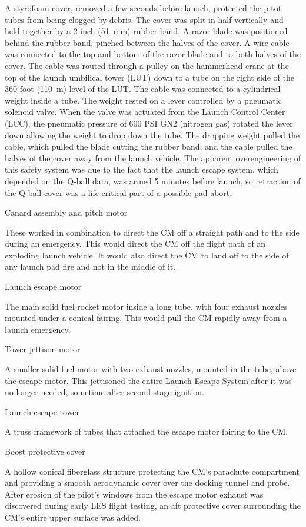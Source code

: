 A styrofoam cover, removed a few seconds before launch, protected the
pitot tubes from being clogged by debris. The cover was split in half
vertically and held together by a 2-inch (51~mm) rubber band. A razor
blade was positioned behind the rubber band, pinched between the halves
of the cover. A wire cable was connected to the top and bottom of the
razor blade and to both halves of the cover. The cable was routed
through a pulley on the hammerhead crane at the top of the launch
umbilical tower (LUT) down to a tube on the right side of the 360-foot
(110~m) level of the LUT. The cable was connected to a cylindrical
weight inside a tube. The weight rested on a lever controlled by a
pneumatic solenoid valve. When the valve was actuated from the Launch
Control Center (LCC), the pneumatic pressure of 600 PSI GN2 (nitrogen
gas) rotated the lever down allowing the weight to drop down the tube.
The dropping weight pulled the cable, which pulled the blade cutting the
rubber band, and the cable pulled the halves of the cover away from the
launch vehicle. The apparent overengineering of this safety system was
due to the fact that the launch escape system, which depended on the
Q-ball data, was armed 5 minutes before launch, so retraction of the
Q-ball cover was a life-critical part of a possible pad abort.

Canard assembly and pitch motor

These worked in combination to direct the CM off a straight path and to
the side during an emergency. This would direct the CM off the flight
path of an exploding launch vehicle. It would also direct the CM to land
off to the side of any launch pad fire and not in the middle of it.

Launch escape motor

The main solid fuel rocket motor inside a long tube, with four exhaust
nozzles mounted under a conical fairing. This would pull the CM rapidly
away from a launch emergency.

Tower jettison motor

A smaller solid fuel motor with two exhaust nozzles, mounted in the
tube, above the escape motor. This jettisoned the entire Launch Escape
System after it was no longer needed, sometime after second stage
ignition.

Launch escape tower

A truss framework of tubes that attached the escape motor fairing to the
CM.

Boost protective cover

A hollow conical fiberglass structure protecting the CM's parachute
compartment and providing a smooth aerodynamic cover over the docking
tunnel and probe. After erosion of the pilot's windows from the escape
motor exhaust was discovered during early LES flight testing, an aft
protective cover surrounding the CM's entire upper surface was added.


